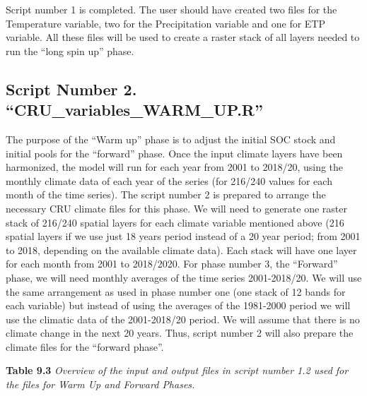 \documentclass[
  10pt,
  b5paper,
]{book}
\begin{document}
Script number 1 is completed. The user should have created two files for the Temperature variable, two for the Precipitation variable and one for ETP variable. All these files will be used to create a raster stack of all layers needed to run the ``long spin up'' phase.

\hypertarget{script-number-2.-cru_variables_warm_up.r}{%
\subsection{Script Number 2. ``CRU\_variables\_WARM\_UP.R''}\label{script-number-2.-cru_variables_warm_up.r}}

The purpose of the ``Warm up'' phase is to adjust the initial SOC stock and initial pools for the ``forward'' phase. Once the input climate layers have been harmonized, the model will run for each year from 2001 to 2018/20, using the monthly climate data of each year of the series (for 216/240 values for each month of the time series). The script number 2 is prepared to arrange the necessary CRU climate files for this phase. We will need to generate one raster stack of 216/240 spatial layers for each climate variable mentioned above (216 spatial layers if we use just 18 years period instead of a 20 year period; from 2001 to 2018, depending on the available climate data). Each stack will have one layer for each month from 2001 to 2018/2020.
For phase number 3, the ``Forward'' phase, we will need monthly averages of the time series 2001-2018/20. We will use the same arrangement as used in phase number one (one stack of 12 bands for each variable) but instead of using the averages of the 1981-2000 period we will use the climatic data of the 2001-2018/20 period. We will assume that there is no climate change in the next 20 years. Thus, script number 2 will also prepare the climate files for the ``forward phase''.

\textbf{Table 9.3} \emph{Overview of the input and output files in script number 1.2 used for the files for Warm Up and Forward Phases.}
\end{document}
